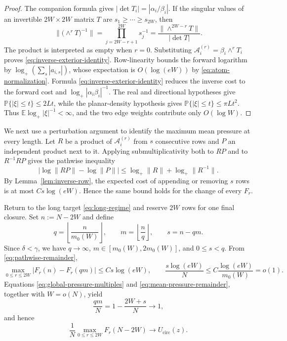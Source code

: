 \documentclass[11pt,reqno]{amsart}
\numberwithin{equation}{section}
\theoremstyle{definition}
\theoremstyle{remark}
\newcommand{\E}{\mathbb E}
\newcommand{\Pp}{\mathbb P}
\newcommand{\1}{\mathbf 1}
\newcommand{\cir}{\mathrm{circ}}
\begin{document}
\begin{proof}
The companion formula gives
$|\det T_i|=|\alpha_i/\beta_i|$.  If the singular values of an invertible
$2W\times2W$ matrix $T$ are $s_1\ge\cdots\ge s_{2W}$, then
\[
 \|\big(\wedge^rT\big)^{-1}\|
 =\prod_{j=2W-r+1}^{2W}s_j^{-1}
 =\frac{\|\wedge^{2W-r}T\|}{|\det T|}.
\]
The product is interpreted as empty when \(r=0\).
Substituting $\mathcal A_i^{(r)}=\beta_i\wedge^rT_i$ proves
\eqref{eq:inverse-exterior-identity}.  Row-linearity bounds the forward
logarithm by
$\log_+(\sum_s|a_{i,s}|)$, whose expectation is $O(\log(eW))$ by
\eqref{eq:atom-normalization}.  Formula
\eqref{eq:inverse-exterior-identity} reduces
the inverse cost to the forward cost and
$\log_+|\alpha_i\beta_i|^{-1}$.  The real and directional hypotheses give
$\Pp\{|\xi|\le t\}\le2Lt$, while the planar-density hypothesis gives
$\Pp\{|\xi|\le t\}\le\pi Lt^2$.  Thus
$\E\log_+|\xi|^{-1}<\infty$, and the two edge weights contribute only
$O(\log W)$.
\end{proof}

We next use a perturbation argument to identify the maximum mean pressure
at every length.
Let $R$ be a product of $\mathcal A_i^{(r)}$ from $s$ consecutive rows and $P$ an independent product
next to it.  Applying submultiplicativity both to $RP$ and to $R^{-1}RP$
gives the pathwise inequality
\begin{equation}\label{eq:pathwise-remainder}
 |\log\|RP\|-\log\|P\||
 \le\log_+\|R\|+\log_+\|R^{-1}\|.
\end{equation}
By Lemma~\ref{lem:inverse-row}, the expected cost of appending or removing
$s$ rows is at most $Cs\log(eW)$.  Hence the same bound holds for the
change of every $F_r$.

Return to the long target \eqref{eq:long-regime} and reserve \(2W\) rows
for one final closure.  Set \(n:=N-2W\) and define
\begin{equation}\label{eq:balanced-cell-division}
 q=\left\lfloor\frac n{m_0(W)}\right\rfloor,\qquad
 m=\left\lfloor\frac nq\right\rfloor,\qquad
 s=n-qm.
\end{equation}
Since \(\delta<\gamma\), we have \(q\to\infty\),
\(m\in[m_0(W),2m_0(W)]\), and \(0\leq s<q\).  From
\eqref{eq:pathwise-remainder},
\begin{equation}\label{eq:mean-pressure-remainder}
 \max_{0\leq r\leq2W}|F_r(n)-F_r(qm)|\le Cs\log(eW),
 \qquad
 \frac{s\log(eW)}N\le C\frac{\log(eW)}{m_0(W)}=o(1).
\end{equation}
Equations \eqref{eq:global-pressure-multiples} and
\eqref{eq:mean-pressure-remainder}, together with $W=o(N)$, yield
\[
 \frac{qm}{N}=1-\frac{2W+s}{N}\longrightarrow1,
\]
and hence
\begin{equation}\label{eq:target-mean-pressure}
 \frac1N\max_{0\le r\le2W}F_r(N-2W)\longrightarrow U_{\cir}(z).
\end{equation}
\end{document}
